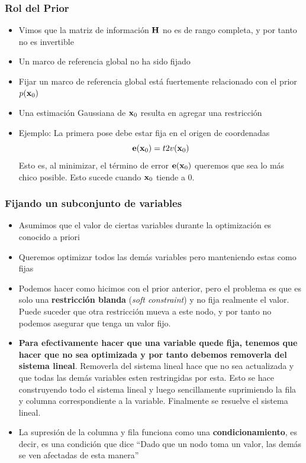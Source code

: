 \begin{frame}
    \frametitle{Rol del Prior}
    
    \begin{itemize}
        \item Vimos que la matriz de información $\boldsymbol{\mathbf{H}}$ no es de rango completa, y por tanto no es invertible
        \item Un marco de referencia global no ha sido fijado
        \item Fijar un marco de referencia global está fuertemente relacionado con el prior $p(\boldsymbol{\mathbf{x}}_{0})$
        \item Una estimación Gaussiana de $\boldsymbol{\mathbf{x}}_{0}$ resulta en agregar una restricción
        \item Ejemplo: La primera pose debe estar fija en el origen de coordenadas
        \begin{equation*}
            \boldsymbol{\mathbf{e}}(\boldsymbol{\mathbf{x}}_{0}) = t2v(\boldsymbol{\mathbf{x}}_{0})
        \end{equation*}
        Esto es, al minimizar, el término de error $\boldsymbol{\mathbf{e}}(\boldsymbol{\mathbf{x}}_{0})$ queremos que sea lo más chico posible. Esto sucede cuando $\boldsymbol{\mathbf{x}}_{0}$ tiende a 0.
    \end{itemize}
    
\end{frame}

\begin{frame}
    \frametitle{Fijando un subconjunto de variables}
    
    \begin{itemize}
        \item Asumimos que el valor de ciertas variables durante la optimización es conocido a priori
        \item Queremos optimizar todos las demás variables pero manteniendo estas como fijas
        \item Podemos hacer como hicimos con el prior anterior, pero el problema es que es solo una {\bf restricción blanda} (\emph{soft constraint}) y no fija realmente el valor. Puede suceder que otra restricción mueva a este nodo, y por tanto no podemos asegurar que tenga un valor fijo.
        \item \textbf{Para efectivamente hacer que una variable quede fija, tenemos que hacer que no sea optimizada y por tanto debemos removerla del sistema lineal}. Removerla del sistema lineal hace que no sea actualizada y que todas las demás variables esten restringidas por esta. Esto se hace construyendo todo el sistema lineal y luego sencillamente suprimiendo la fila y columna correspondiente a la variable. Finalmente se resuelve el sistema lineal.
        \item La supresión de la columna y fila funciona como una {\bf condicionamiento}, es decir, es una condición que dice ``Dado que un nodo toma un valor, las demás se ven afectadas de esta manera''
    \end{itemize}
    
\end{frame}

